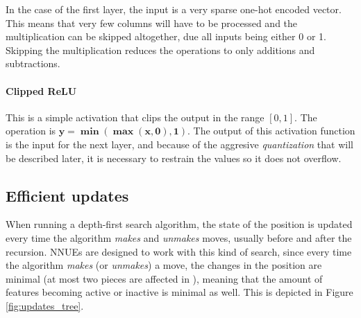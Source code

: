 In the case of the first layer, the input is a very sparse one-hot encoded vector. This means that very few columns will have to be processed and the multiplication can be skipped altogether, due all inputs being either 0 or 1. Skipping the multiplication reduces the operations to only additions and subtractions.

\paragraph[short]{Clipped ReLU} This is a simple activation that clips the output in the range $[0, 1]$. The operation is $\bm{y=\min(\max(x,0),1)}$.
The output of this activation function is the input for the next layer, and because of the aggresive \textit{quantization} that will be described later, it is necessary to restrain the values so it does not overflow. \\

\subsection{Efficient updates}

When running a depth-first search algorithm, the state of the position is updated every time the algorithm \textit{makes} and \textit{unmakes} moves, usually before and after the recursion.
NNUEs are designed to work with this kind of search, since every time the algorithm \textit{makes} (or \textit{unmakes}) a move, the changes in the position are minimal (at most two pieces are affected in ), meaning that the amount of features becoming active or inactive is minimal as well. This is depicted in Figure \ref{fig:updates_tree}.

